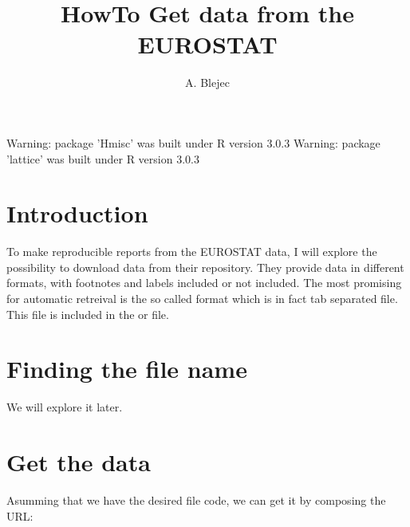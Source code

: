 \documentclass[a4paper,12pt]{article}\usepackage[]{graphicx}\usepackage[]{color}
\begin{document}
\title{HowTo Get data from the EUROSTAT}
\author{A. Blejec}
%

\maketitle
\tableofcontents

\begin{Schunk}
\begin{Soutput}
Warning: package 'Hmisc' was built under R version 3.0.3
Warning: package 'lattice' was built under R version 3.0.3
\end{Soutput}
\end{Schunk}

\section{Introduction}

To make reproducible reports from the EUROSTAT data, I will explore
the possibility to download data from their repository. They provide data in different formats, with footnotes and labels included or not included. The most promising for automatic retreival is the so called  format which is in fact tab separated file. This file is included in the  or  file.

\section{Finding the file name}

We will explore it later.

\section{Get the data}

Asumming that we have the desired file code, we can get it by composing the
URL:
\end{document}

